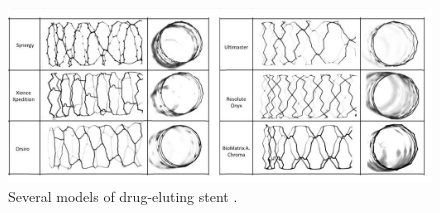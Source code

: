 \begin{figure}[H]
  \centering
  \includegraphics[scale=0.66]{./02_chaps/cap_review/figure/stent_drug.jpg}
 \caption{Several models of drug-eluting stent \cite{stent2016}.}
 \label{stent drug}
\end{figure}

